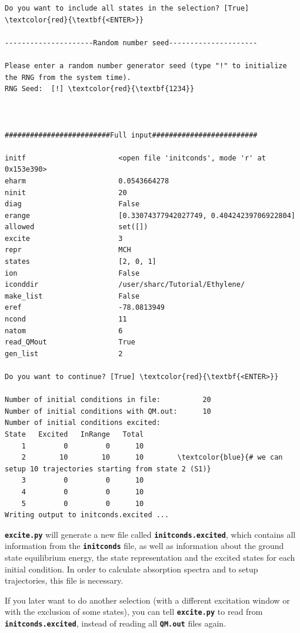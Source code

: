 \documentclass[a4paper,11pt,DIV=15,openany]{scrbook}
\newcommand{\ttt}[1]{\textbf{\texttt{#1}}}
\begin{document}
\begin{oframed}
\begin{Verbatim}[commandchars=\\\{\}]
Do you want to include all states in the selection? [True] \textcolor{red}{\textbf{<ENTER>}}

---------------------Random number seed---------------------

Please enter a random number generator seed (type "!" to initialize the RNG from the system time).
RNG Seed:  [!] \textcolor{red}{\textbf{1234}}



#########################Full input#########################

initf                      <open file 'initconds', mode 'r' at 0x153e390>
eharm                      0.0543664278
ninit                      20
diag                       False
erange                     [0.33074377942027749, 0.40424239706922804]
allowed                    set([])
excite                     3
repr                       MCH
states                     [2, 0, 1]
ion                        False
iconddir                   /user/sharc/Tutorial/Ethylene/
make_list                  False
eref                       -78.0813949
ncond                      11
natom                      6
read_QMout                 True
gen_list                   2

Do you want to continue? [True] \textcolor{red}{\textbf{<ENTER>}}

Number of initial conditions in file:          20
Number of initial conditions with QM.out:      10
Number of initial conditions excited:
State   Excited   InRange   Total
    1         0         0      10
    2        10        10      10        \textcolor{blue}{# we can setup 10 trajectories starting from state 2 (S1)}
    3         0         0      10
    4         0         0      10
    5         0         0      10
Writing output to initconds.excited ...
\end{Verbatim}
\end{oframed}

\normalsize

\ttt{excite.py} will generate a new file called \ttt{initconds.excited}, which contains all information from the \ttt{initconds} file, as well as information about the ground state equilibrium energy, the state representation and the excited states for each initial condition. In order to calculate absorption spectra and to setup trajectories, this file is necessary.

If you later want to do another selection (with a different excitation window or with the exclusion of some states), you can tell \ttt{excite.py} to read from \ttt{initconds.excited}, instead of reading all \ttt{QM.out} files again. 
\end{document}
